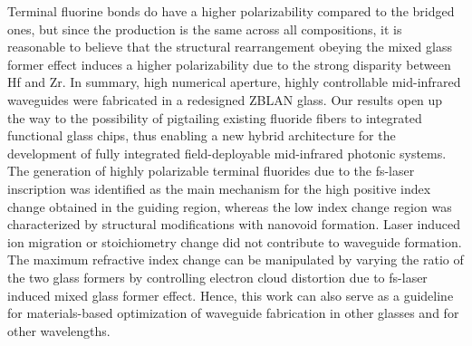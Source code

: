 \documentclass[11pt]{article}
\begin{document}
Terminal fluorine bonds do have a higher polarizability compared to the bridged ones, but since the production is the same across all compositions, it is reasonable to believe that the structural rearrangement obeying the mixed glass former effect induces a higher polarizability due to the strong disparity between Hf and Zr.
In summary, high numerical aperture, highly controllable mid-infrared waveguides were fabricated in a redesigned ZBLAN glass. Our results open up the way to the possibility of pigtailing existing fluoride fibers to integrated functional glass chips, thus enabling a new hybrid architecture for the development of fully integrated field-deployable mid-infrared photonic systems. The generation of highly polarizable terminal fluorides due to the fs-laser inscription was identified as the main mechanism for the high positive index change obtained in the guiding region, whereas the low index change region was characterized by structural modifications with nanovoid formation. Laser induced ion migration or stoichiometry change did not contribute to waveguide formation. The maximum refractive index change can be manipulated by varying the ratio of the two glass formers by controlling electron cloud distortion due to fs-laser induced mixed glass former effect. Hence, this work can also serve as a guideline for materials-based optimization of waveguide fabrication in other glasses and for other wavelengths.
\end{document}
